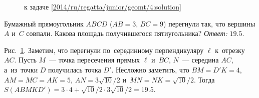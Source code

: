\ifsolution
\begin{figure}\centering
    \caption{к задаче \ref{2014/ru/regatta/junior/geomt/4:solution}}
    \label{2014/ru/regatta/junior/geomt/4:solution:fig}
\end{figure}%
\fi %

\problem
Бумажный прямоугольник $ABCD$ ($AB = 3$, $BC = 9$) перегнули так, что
вершины $A$ и~$C$ совпали.
Какова площадь получившегося пятиугольника?
\solution
\label{2014/ru/regatta/junior/geomt/4:solution}%
\emph{Ответ:} $19.5$.
\par
Рис.~\ref{2014/ru/regatta/junior/geomt/4:solution:fig}.
Заметим, что перегнули по~серединному перпендикуляру $\ell$ к~отрезку $AC$.
Пусть $M$~--- точка пересечения прямых $\ell$ и~$BC$, $N$~--- середина $AC$,
а~из~точки $D$ получилась точка $D'$.
Несложно заметить, что $BM = D'K = 4$, $AM = MC = AK = 5$,
$AN = 3 \sqrt{10} / 2$ и~$MN = NK = \sqrt{10} / 2$.
Тогда $S(ABMKD') = 3 \cdot 4 + \sqrt{10} / 2 \cdot 3 \sqrt{10} / 2 = 19.5$.
\endproblem
